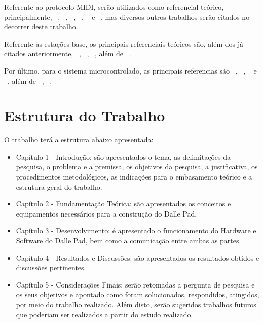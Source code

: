         Referente ao protocolo MIDI, serão utilizados como referencial teórico, principalmente, ~\cite{Alves}, ~\cite{Hewitt}, ~\cite{Colbeck}, ~\cite{Guerin}, ~\cite{McGuire} e ~\cite{Huber}, mas diversos outros trabalhos serão citados no decorrer deste trabalho.

        Referente às estações base, os principais referenciais teóricos são, além dos já citados anteriormente, ~\cite{Ballou}, ~\cite{Gregoire}, ~\cite{Jackson}, além de ~\cite{AndroidDeveloper}.

        Por último, para o sistema microcontrolado, as principais referencias são ~\cite{Wheat}, ~\cite{Bayle}, ~\cite{Ghassaei} e ~\cite{Hass}, além de ~\cite{Arduino2014}, ~\cite{ArduinoRef2014}.

    \section{Estrutura do Trabalho}

        O trabalho terá a estrutura abaixo apresentada:

        \begin{itemize}
          \item Capítulo 1 - Introdução: são apresentados o tema, as delimitações da pesquisa, o problema e a premissa, os objetivos da pesquisa, a justificativa, os procedimentos metodológicos, as indicações para o embasamento teórico e a estrutura geral do trabalho.

          \item Capítulo 2 - Fundamentação Teórica: são apresentados os conceitos e equipamentos necessários para a construção do Dalle Pad.

          \item Capítulo 3 - Desenvolvimento: é apresentado o funcionamento do Hardware e Software do Dalle Pad, bem como a comunicação entre ambas as partes.

          \item Capítulo 4 - Resultados e Discussões: são apresentados os resultados obtidos e discussões pertinentes.

          \item Capítulo 5 - Considerações Finais: serão retomadas a pergunta de pesquisa e os seus objetivos e apontado como foram solucionados, respondidos, atingidos, por meio do trabalho realizado. Além disto, serão sugeridos trabalhos futuros que poderiam ser realizados a partir do estudo realizado.
        \end{itemize}

